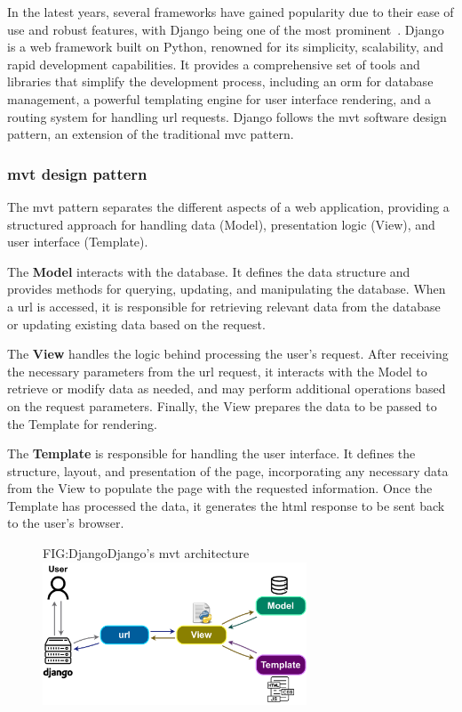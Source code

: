 In the latest years, several frameworks have gained popularity due to their ease of use and robust features, with Django being one of the most prominent~\cite{DJANGO-POP, DJANGO}. Django is a web framework built on Python, renowned for its simplicity, scalability, and rapid development capabilities. It provides a comprehensive set of tools and libraries that simplify the development process, including an \ac{orm} for database management, a powerful templating engine for user interface rendering, and a routing system for handling \acs{url} requests. Django follows the \ac{mvt} software design pattern, an extension of the traditional \ac{mvc} pattern.

\subsubsection{\acs{mvt} design pattern}

The \acl{mvt} pattern separates the different aspects of a web application, providing a structured approach for handling data (Model), presentation logic (View), and user interface (Template).

\begin{compactitem}[\textbullet]
    \item The \textbf{Model} interacts with the database. It defines the data structure and provides methods for querying, updating, and manipulating the database. When a \acs{url} is accessed, it is responsible for retrieving relevant data from the database or updating existing data based on the request.
    \item The \textbf{View} handles the logic behind processing the user's request. After receiving the necessary parameters from the \acs{url} request, it interacts with the Model to retrieve or modify data as needed, and may perform additional operations based on the request parameters. Finally, the View prepares the data to be passed to the Template for rendering.
    \item The \textbf{Template} is responsible for handling the user interface. It defines the structure, layout, and presentation of the page, incorporating any necessary data from the View to populate the page with the requested information. Once the Template has processed the data, it generates the \acs{html} response to be sent back to the user's browser.
\end{compactitem}

\begin{figure}[Django's Model-View-Template architecture]{FIG:Django}{Django's \acl{mvt} architecture}\includegraphics[width=0.7\textwidth]{img/Django.pdf}
\end{figure}

